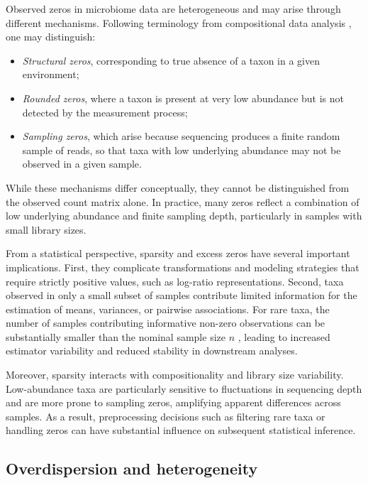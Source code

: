 Observed zeros in microbiome data are heterogeneous and may arise through different mechanisms. 
Following terminology from compositional data analysis \citep{martin-fernandez2003dealing,martin2011dealing,filzmoser2018applied}, one may distinguish:

\begin{itemize}
    \item \emph{Structural zeros}, corresponding to true absence of a taxon in a given environment;
    \item \emph{Rounded zeros}, where a taxon is present at very low abundance but is not detected by the measurement process;
    \item \emph{Sampling zeros}, which arise because sequencing produces a finite random sample of reads, so that taxa with low underlying abundance may not be observed in a given sample.
\end{itemize}

While these mechanisms differ conceptually, they cannot be distinguished from the observed count matrix alone. 
In practice, many zeros reflect a combination of low underlying abundance and finite sampling depth, particularly in samples with small library sizes.

From a statistical perspective, sparsity and excess zeros have several important implications. 
First, they complicate transformations and modeling strategies that require strictly positive values, such as log-ratio representations. 
Second, taxa observed in only a small subset of samples contribute limited information for the estimation of means, variances, or pairwise associations. 
For rare taxa, the number of samples contributing informative non-zero observations can be substantially smaller than the nominal sample size $n$ \citep{kurtz2015sparse}, leading to increased estimator variability and reduced stability in downstream analyses.

Moreover, sparsity interacts with compositionality and library size variability. 
Low-abundance taxa are particularly sensitive to fluctuations in sequencing depth and are more prone to sampling zeros, amplifying apparent differences across samples. 
As a result, preprocessing decisions such as filtering rare taxa or handling zeros can have substantial influence on subsequent statistical inference.

\subsection{Overdispersion and heterogeneity}
\label{sec:2micro:charact:overdispersion}

